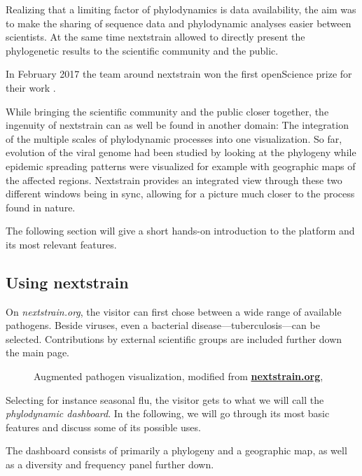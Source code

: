 \documentclass[12pt]{scrartcl}
\begin{document}
  Realizing that a limiting factor of phylodynamics is data availability, the aim was to make the sharing of sequence data and phylodynamic analyses easier between scientists. At the same time nextstrain allowed to directly present the phylogenetic results to the scientific community and the public.

  In February 2017 the team around nextstrain won the first \gls{openScience} prize for their work \citep{hudson17}.

  While bringing the scientific community and the public closer together, the ingenuity of nextstrain can as well be found in another domain: The integration of the multiple scales of phylodynamic processes into one visualization. So far, evolution of the viral genome had been studied by looking at the phylogeny while epidemic spreading patterns were visualized for example with geographic maps of the affected regions. Nextstrain provides an integrated view through these two different windows being in sync, allowing for a picture much closer to the process found in nature.

  The following section will give a short hands-on introduction to the platform and its most relevant features.

  \subsection{Using nextstrain}

  On \textit{nextstrain.org}, the visitor can first chose between a wide range of available pathogens. Beside viruses, even a bacterial disease---tuberculosis---can be selected. Contributions by external scientific groups are included further down the main page.

  \begin{figure}[h!]
    \caption{Augmented pathogen visualization, modified from \href{https://nextstrain.org}{\textbf{nextstrain.org}}, \cite{leeMoncla+20}}
  \end{figure}

  Selecting for instance seasonal flu, the visitor gets to what we will call the \textit{phylodynamic dashboard}. In the following, we will go through its most basic features and discuss some of its possible uses.

  The dashboard consists of primarily a phylogeny and a geographic map, as well as a diversity and frequency panel further down.
\end{document}
